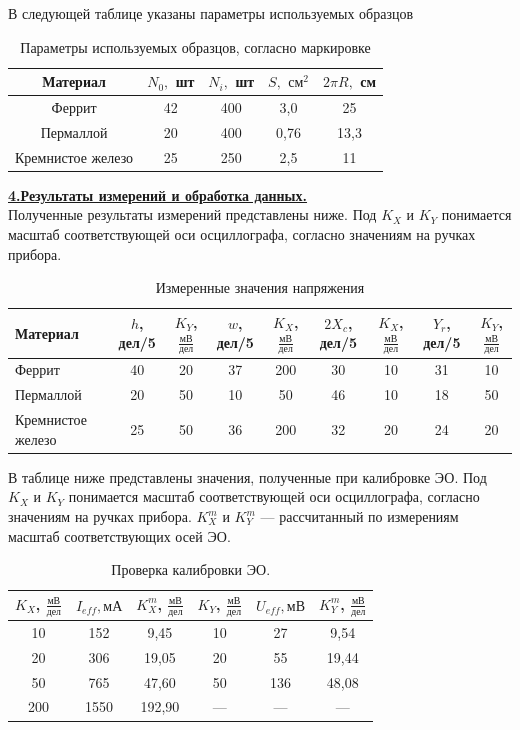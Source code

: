 \documentclass[12pt, letterpaper, oneside]{article}
\begin{document}
В следующей таблице указаны параметры используемых образцов\\
\begin{table}[H]
\centering
\caption{Параметры используемых образцов, согласно маркировке}
\begin{tabular}{|c|c|c|c|c|}
\hline
Материал & $N_0,$ шт & $N_i,$ шт & $S,$ $см^2$ & $2\pi R,$ см\\
\hline
Феррит & 42 & 400 & 3,0 & 25\\
\hline
Пермаллой & 20 & 400 & 0,76 & 13,3\\
\hline
Кремнистое железо & 25 & 250 & 2,5 & 11\\
\hline
\end{tabular}
\end{table}
\noindent\textbf{\underline{4.Результаты измерений и обработка данных.}}\\
Полученные результаты измерений представлены ниже. Под $K_X$ и $K_Y$ понимается масштаб соответствующей оси осциллографа, согласно значениям на ручках прибора.
\begin{table}[H]\label{raw_data}
\centering
\caption{Измеренные значения напряжения}
\begin{tabular}{|m{2.1cm}|c|c||c|c||c|c||c|c|}
\hline
Материал & $h$, дел/5 & $K_Y$, $\frac{мВ}{дел}$ & $w$, дел/5 & $K_X$, $\frac{мВ}{дел}$ & $2X_c$, дел/5 & $K_X$, $\frac{мВ}{дел}$ & $Y_r$, дел/5 & $K_Y$, $\frac{мВ}{дел}$\\
\hline
Феррит & 40 & 20 & 37 & 200 & 30 & 10 & 31 & 10\\
\hline
Пермаллой & 20 & 50 & 10 & 50 & 46 & 10 & 18 & 50\\
\hline
Кремнистое железо & 25 & 50 & 36 & 200 & 32 & 20 & 24 & 20\\
\hline
\end{tabular}
\end{table}\noindent
В таблице ниже представлены значения, полученные при калибровке ЭО. Под $K_X$ и $K_Y$ понимается масштаб соответствующей оси осциллографа, согласно значениям на ручках прибора. $K_X^m$ и $K_Y^m$ — рассчитанный по измерениям масштаб соответствующих осей ЭО.
\begin{table}[H]
\centering
\caption{Проверка калибровки ЭО.}
\begin{tabular}{|c|c|c||c|c|c|}
\hline
$K_X$, $\frac{мВ}{дел}$ & $I_{eff}, мА$ & $K_X^m$, $\frac{мВ}{дел}$ & $K_Y$, $\frac{мВ}{дел}$ & $U_{eff}, мВ$ & $K_Y^m$, $\frac{мВ}{дел}$\\
\hline
10 & 152 & 9,45 & 10 & 27 & 9,54\\
\hline
20 & 306 & 19,05 & 20 & 55 & 19,44\\
\hline
50 & 765 & 47,60 & 50 & 136 & 48,08\\
\hline
200 & 1550 & 192,90 & — & — & —\\
\hline
\end{tabular}
\end{table}\noindent
\end{document}

